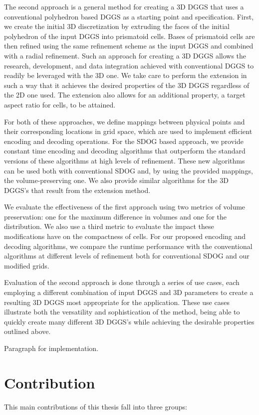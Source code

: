 The second approach is a general method for creating a 3D DGGS that uses a conventional polyhedron based DGGS as a starting point and specification.
First, we create the initial 3D discretization by extruding the faces of the initial polyhedron of the input DGGS into prismatoid cells.
Bases of prismatoid cells are then refined using the same refinement scheme as the input DGGS and combined with a radial refinement.
Such an approach for creating a 3D DGGS allows the research, development, and data integration achieved with conventional DGGS to readily be leveraged with the 3D one.
We take care to perform the extension in such a way that it achieves the desired properties of the 3D DGGS regardless of the 2D one used.
The extension also allows for an additional property, a target aspect ratio for cells, to be attained.


For both of these approaches, we define mappings between physical points and their corresponding locations in grid space, which are used to implement efficient encoding and decoding operations.
For the SDOG based approach, we provide constant time encoding and decoding algorithms that outperform the standard versions of these algorithms at high levels of refinement.
These new algorithms can be used both with conventional SDOG and, by using the provided mappings, the volume-preserving one.
We also provide similar algorithms for the 3D DGGS's that result from the extension method.


We evaluate the effectiveness of the first approach using two metrics of volume preservation: one for the maximum difference in volumes and one for the distribution.
We also use a third metric to evaluate the impact these modifications have on the compactness of cells.
For our proposed encoding and decoding algorithms, we compare the runtime performance with the conventional algorithms at different levels of refinement both for conventional SDOG and our modified grids.


Evaluation of the second approach is done through a series of use cases, each employing a different combination of input DGGS and 3D parameters to create a resulting 3D DGGS most appropriate for the application.
These use cases illustrate both the versatility and sophistication of the method, being able to quickly create many different 3D DGGS's while achieving the desirable properties outlined above.

Paragraph for implementation.


\section{Contribution}
This main contributions of this thesis fall into three groups:

